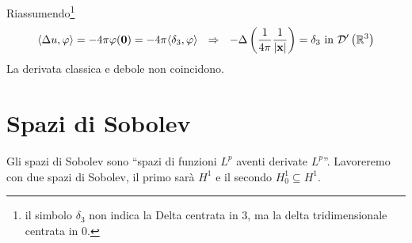 Riassumendo\footnote{il simbolo $\displaystyle \delta _{3}$ non indica la Delta centrata in $3$, ma la delta tridimensionale centrata in $0$.}
\begin{equation*}
    \langle \Delta u,\varphi \rangle =-4\pi \varphi (\mathbf{0}) =-4\pi \langle \delta _{3} ,\varphi \rangle \ \ \Rightarrow \ \ -\Delta \left(\frac{1}{4\pi }\frac{1}{| \mathbf{x}| }\right) =\delta _{3} \ \text{in} \ \mathcal{D} '\left(\mathbb{R}^{3}\right)
\end{equation*}
La derivata classica e debole non coincidono.

\section{Spazi di Sobolev}

Gli spazi di Sobolev sono ``spazi di funzioni $L^{p}$ aventi derivate $L^{p}$''. Lavoreremo con due spazi di Sobolev, il primo sarà $H^{1}$ e il secondo $H^{1}_{0} \subseteq H^{1}$.

